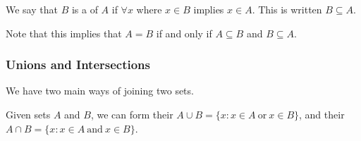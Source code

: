 \begin{definition}[Subsets]
	We say that $B$ is a  of $A$ if $\forall x$ where $x \in B$ implies $x \in A$. This is written $B \subseteq A$.
\end{definition}


	






Note that this implies that $A = B$ if and only if $A \subseteq B$ and $B \subseteq A$.

\subsubsection{Unions and Intersections}

We have two main ways of joining two sets.

\begin{definition}
	Given sets $A$ and $B$, we can form their  $A \cup B = \{x : x \in A \ \text{or}\ x \in B\}$, and their  $A \cap B = \{x  : x \in A \ \text{and}\ x \in B\}$. 
\end{definition} 

